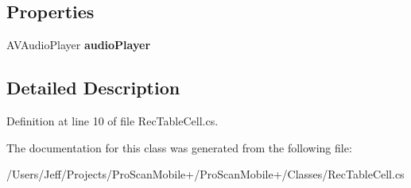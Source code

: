 \subsection*{Properties}
\begin{DoxyCompactItemize}
\item 
\hypertarget{class_pro_scan_mobile_1_1_custom_rec_cell_a5584c336e04e83d965a9281b62192152}{A\-V\-Audio\-Player {\bfseries audio\-Player}}\label{class_pro_scan_mobile_1_1_custom_rec_cell_a5584c336e04e83d965a9281b62192152}

\end{DoxyCompactItemize}


\subsection{Detailed Description}


Definition at line 10 of file Rec\-Table\-Cell.\-cs.



The documentation for this class was generated from the following file\-:\begin{DoxyCompactItemize}
\item 
/\-Users/\-Jeff/\-Projects/\-Pro\-Scan\-Mobile+/\-Pro\-Scan\-Mobile+/\-Classes/Rec\-Table\-Cell.\-cs\end{DoxyCompactItemize}
